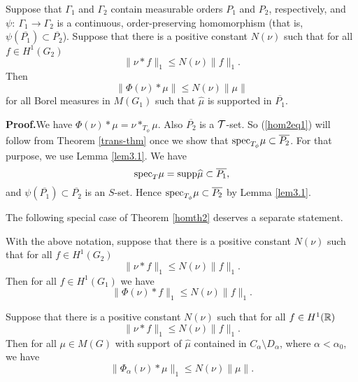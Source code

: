 \documentclass[12pt,leqno]{article}
\def\R{\Bbb R}
\def\supp{{\rm supp}}
\def\spec{{\rm spec}}
\begin{document}
\begin{thm}
Suppose that $\Gamma_1$ and $\Gamma_2$ contain 
measurable orders $P_1$ and $P_2$, respectively, and
$\psi:\ \Gamma_1\rightarrow \Gamma_2$ is a continuous,
order-preserving homomorphism (that is, $\psi(\overline{P_1})\subset
\overline{P_2}$).  
Suppose that there is a positive 
constant $N(\nu)$ such that for all $f\in H^1(G_2)$
\begin{equation}
\|\nu*f\|_1\leq N(\nu)\|f\|_1.
\label{hom1eq}
\end{equation}
Then
\begin{equation}
\|\Phi(\nu)*\mu\|\leq N(\nu)\|\mu\|
\label{hom2eq1}
\end{equation}
for all Borel measures in $M(G_1)$ such that
$\widehat{\mu}$ is supported in $\overline{P_1}$.
\label{homth2}
\end{thm}

{\bf Proof.}\quad We have $\Phi(\nu)*\mu=\nu*_{T_\phi}\mu$.
Also $\overline{P_2}$ is a ${\cal T}$-set.
So (\ref{hom2eq1}) will follow from Theorem 
\ref{trans-thm}
once we show that $\spec_{T_\phi}\mu\subset \overline{P_2}$.  For that purpose, we use Lemma \ref{lem3.1}.
We have 
$$\spec_T\mu =\supp \widehat{\mu}\subset \overline{P_1},$$
and $\psi(\overline{P_1})\subset \overline{P_2}$ is an $S$-set.  Hence 
$\spec_{T_\phi}\mu\subset \overline{P_2}$
by Lemma \ref{lem3.1}.




The following special case of Theorem \ref{homth2} deserves a separate 
statement.


\begin{thm}
With the above notation, suppose that there is a positive 
constant $N(\nu)$ such that for all $f\in H^1(G_2)$
\begin{equation}
\|\nu*f\|_1\leq N(\nu)\|f\|_1.
\label{hom1eq1}
\end{equation}
Then for all $f\in H^1(G_1)$ we have
\begin{equation}
\|\Phi(\nu)*f\|_1\leq N(\nu)\|f\|_1.
\label{hom1eq2}
\end{equation}
\label{homth1}
\end{thm}


\begin{thm}
Suppose that there is a positive 
constant $N(\nu)$ such that for all $f\in H^1(\R)$
\begin{equation}
\|\nu*f\|_1\leq N(\nu)\|f\|_1.
\label{hom2eq11}
\end{equation}
Then for all $\mu\in M(G)$
with support of $\widehat{\mu}$ contained in
$C_\alpha\setminus D_\alpha$, where $\alpha<\alpha_0$, 
we have
\begin{equation}
\|\Phi_\alpha(\nu)*\mu\|_1\leq N(\nu)\|\mu\|.
\label{hom2eq2}
\end{equation}
\label{varianthomth2}
\end{thm}
\end{document}
